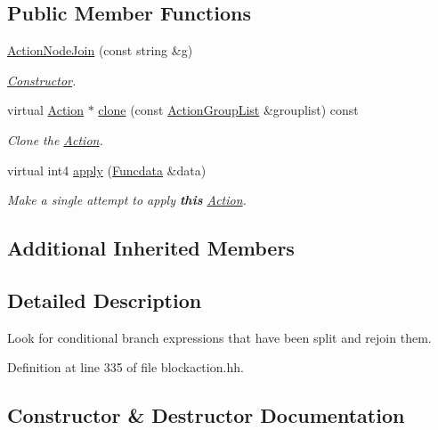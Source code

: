 \subsection*{Public Member Functions}
\begin{DoxyCompactItemize}
\item 
\mbox{\hyperlink{class_action_node_join_a6ccac418c73801aa6e308200b7873b82}{Action\+Node\+Join}} (const string \&g)
\begin{DoxyCompactList}\small\item\em \mbox{\hyperlink{class_constructor}{Constructor}}. \end{DoxyCompactList}\item 
virtual \mbox{\hyperlink{class_action}{Action}} $\ast$ \mbox{\hyperlink{class_action_node_join_a51276a131d48cca6feead5edad6cc3d4}{clone}} (const \mbox{\hyperlink{class_action_group_list}{Action\+Group\+List}} \&grouplist) const
\begin{DoxyCompactList}\small\item\em Clone the \mbox{\hyperlink{class_action}{Action}}. \end{DoxyCompactList}\item 
virtual int4 \mbox{\hyperlink{class_action_node_join_a1be9f170c96721c2f8770fc04b1f41df}{apply}} (\mbox{\hyperlink{class_funcdata}{Funcdata}} \&data)
\begin{DoxyCompactList}\small\item\em Make a single attempt to apply {\bfseries{this}} \mbox{\hyperlink{class_action}{Action}}. \end{DoxyCompactList}\end{DoxyCompactItemize}
\subsection*{Additional Inherited Members}


\subsection{Detailed Description}
Look for conditional branch expressions that have been split and rejoin them. 

Definition at line 335 of file blockaction.\+hh.



\subsection{Constructor \& Destructor Documentation}
\mbox{\label{class_action_node_join_a6ccac418c73801aa6e308200b7873b82}} 
